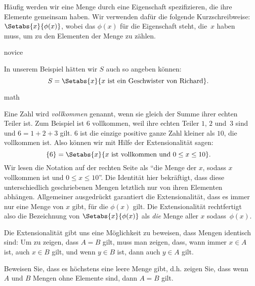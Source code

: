 \documentclass[../../../include/open-logic-section]{subfiles}
\begin{document}
Häufig werden wir eine Menge durch eine Eigenschaft spezifizieren, die ihre Elemente
gemeinsam haben. Wir verwenden dafür die folgende Kurzschreibweise:
$\Setabs{x}{\phi(x)}$, wobei das $\phi(x)$ für die Eigenschaft steht,
die~$x$ haben muss, um zu den Elementen der Menge zu zählen.

\begin{tagblock}{novice}
\begin{ex}
In unserem Beispiel hätten wir $S$ auch so angeben können:
\[
S = \Setabs{x}{x \text{ ist ein Geschwister von Richard}}.
\]
\end{ex}
\end{tagblock}

\begin{tagblock}{math}
\begin{ex}
Eine Zahl wird \emph{vollkommen} genannt, wenn sie gleich der Summe ihrer
echten Teiler ist. Zum Beispiel ist $6$ vollkommen, weil ihre
echten Teiler $1$, $2$ und~$3$ sind und $6 = 1 + 2 + 3$ gilt. $6$ ist die einzige positive ganze Zahl kleiner als $10$, die vollkommen ist. Also
können wir mit Hilfe der Extensionalität sagen:
\[
	\{6\} = \Setabs{x}{x\text{ ist vollkommen und }0 \leq x \leq 10}.
\]
Wir lesen die Notation auf der rechten Seite als ``die Menge der $x$, sodass $x$
vollkommen ist und $0 \leq x \leq 10$''. Die Identität hier bekräftigt, dass diese unterschiedlich 
geschriebenen Mengen letztlich nur von ihren Elementen abhängen.
Allgemeiner ausgedrückt garantiert die Extensionalität, dass es immer
nur eine Menge von $x$ gibt, für die $\phi(x)$ gilt.
Die Extensionalität rechtfertigt also die Bezeichnung von 
$\Setabs{x}{\phi(x)}$ als \emph{die} Menge aller $x$ sodass~$\phi(x)$.
\end{ex}
\end{tagblock}

Die Extensionalität gibt uns eine Möglichkeit zu beweisen, dass Mengen identisch sind: Um zu zeigen, dass $A = B$ gilt, 
muss man zeigen, dass, wann immer $x \in A$ ist, auch $x \in B$ gilt,
und wenn $y \in B$ ist, dann auch $y \in A$ gilt.

\begin{prob}
Beweisen Sie, dass es höchstens eine leere Menge gibt, d.h. zeigen Sie, dass wenn $A$ und $B$
Mengen ohne Elemente sind, dann $A = B$ gilt.
\end{prob}
\end{document}
